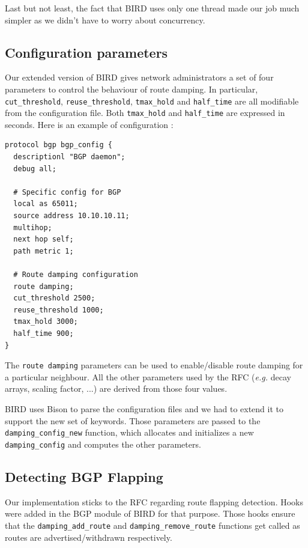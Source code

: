 \documentclass[a4paper,english]{IEEEtran}
\begin{document}
Last but not least, the fact that BIRD uses only one thread made our job much simpler as we didn't have to worry about concurrency.

\subsection{Configuration parameters}

Our extended version of BIRD gives network administrators a set of four parameters to control the behaviour of route damping.
In particular, {\tt\small cut\_threshold}, {\tt\small reuse\_threshold}, {\tt\small tmax\_hold} and {\tt\small half\_time} are all modifiable
from the configuration file.
Both {\tt\small tmax\_hold} and {\tt\small half\_time} are expressed in seconds.
Here is an example of configuration :

\begin{verbatim}
protocol bgp bgp_config {
  descriptionl "BGP daemon";
  debug all;

  # Specific config for BGP
  local as 65011;
  source address 10.10.10.11;
  multihop;
  next hop self;
  path metric 1;
 
  # Route damping configuration
  route damping;
  cut_threshold 2500;
  reuse_threshold 1000;
  tmax_hold 3000;
  half_time 900;
}
\end{verbatim}

The {\tt\small route damping} parameters can be used to enable/disable route damping for a particular neighbour.
All the other parameters used by the RFC (\textit{e.g.} decay arrays, scaling factor, ...) are derived from
those four values.

BIRD uses Bison to parse the configuration files and we had to extend it to support the new set of keywords.
Those parameters are passed to the {\tt\small damping\_config\_new} function, which allocates and initializes a new {\tt\small damping\_config} and computes the 
other parameters.

\subsection{Detecting BGP Flapping}

Our implementation sticks to the RFC regarding route flapping detection.
Hooks were added in the BGP module of BIRD for that purpose.
Those hooks ensure that the {\tt\small damping\_add\_route} and {\tt\small damping\_remove\_route} functions get
called as routes are advertised/withdrawn respectively.
\end{document}
